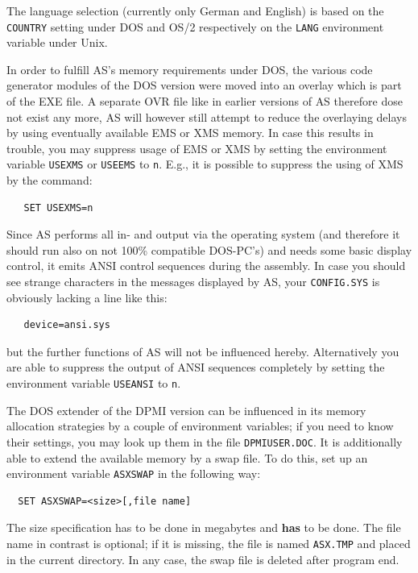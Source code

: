\documentclass[12pt,twoside]{report}
\newcommand{\bb}[1]{{\bf #1}}
\newcommand{\tty}[1]{{\tt #1}}
\newcommand{\asname}{{AS}}
\begin{document}
The language selection (currently only German and English) is based on the
{\tt COUNTRY} setting under DOS and OS/2 respectively on the {\tt LANG}
environment variable under Unix.

In order to fulfill  \asname{}'s memory requirements under
DOS, the various code generator modules of the DOS version were moved into
an overlay which is part of the EXE file.  A separate OVR file like in
earlier versions of \asname{} therefore dose not exist any more, \asname{} will however
still attempt to reduce the overlaying delays by using eventually
available EMS or XMS memory.  In case this results in
trouble, you may suppress usage of EMS or XMS by setting the environment
variable \tty{USEXMS} or \tty{USEEMS} to \tty{n}.  E.g., it is possible to
suppress the using of XMS by the command:
\begin{verbatim}
   SET USEXMS=n
\end{verbatim}
Since \asname{} performs all in- and output via the operating system (and
therefore it should run also on not 100\% compatible DOS-PC's) and
needs some basic display control, it emits ANSI control sequences
during the assembly.
In case you  should see strange characters in the
messages displayed by \asname{}, your \tty{CONFIG.SYS} is obviously lacking a
line like this:
\begin{verbatim}
   device=ansi.sys
\end{verbatim}
but the further  functions of \asname{} will not be
influenced hereby.  Alternatively you are able to suppress the output of
ANSI sequences completely by setting the environment variable
\tty{USEANSI} to \tty{n}.

The DOS extender of the DPMI version  can be
influenced in its memory allocation strategies by a couple of environment
variables; if you need to know their settings, you may look up them in the
file \tty{DPMIUSER.DOC}.  It is additionally able to extend the available
memory by a swap file.  To do this, set up an environment variable
\tty{ASXSWAP} in the following way:
\begin{verbatim}
  SET ASXSWAP=<size>[,file name]
\end{verbatim}
The size specification has to be done in megabytes and \bb{has} to be done.
The file name in contrast is optional; if it is missing, the file is
named \tty{ASX.TMP} and placed in the current directory.  In any case, the
swap file is deleted after program end.
\end{document}
